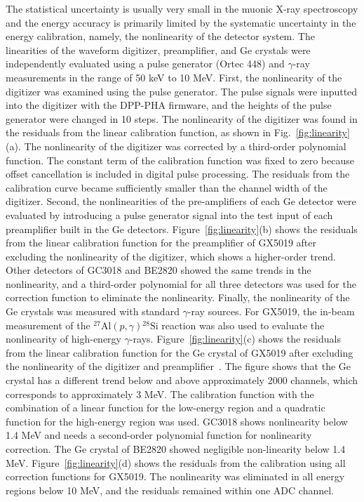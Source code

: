 The statistical uncertainty is usually very small in the muonic X-ray spectroscopy and the energy accuracy is primarily limited by the systematic uncertainty in the energy calibration, namely, the nonlinearity of the detector system.
The linearities of the waveform digitizer, preamplifier, and Ge crystals were independently evaluated using a pulse generator (Ortec 448) and $\gamma$-ray measurements in the range of 50 keV to 10 MeV.
First, the nonlinearity of the digitizer was examined using the pulse generator.
The pulse signals were inputted into the digitizer with the DPP-PHA firmware, and the heights of the pulse generator were changed in 10 steps.
The nonlinearity of the digitizer was found in the residuals from the linear calibration function, as shown in Fig.~\ref{fig:linearity}(a).
The nonlinearity of the digitizer was corrected by a third-order polynomial function.
The constant term of the calibration function was fixed to zero because offset cancellation is included in digital pulse processing.
The residuals from the calibration curve became sufficiently smaller than the channel width of the digitizer.
Second, the nonlinearities of the pre-amplifiers of each Ge detector were evaluated by introducing a pulse generator signal into the test input of each preamplifier built in the Ge detectors. 
Figure~\ref{fig:linearity}(b) shows the residuals from the linear calibration function for the preamplifier of GX5019 after excluding the nonlinearity of the digitizer, which shows a higher-order trend.
Other detectors of GC3018 and BE2820 showed the same trends in the nonlinearity, and a third-order polynomial for all three detectors was used for the correction function to eliminate the nonlinearity.
Finally, the nonlinearity of the Ge crystals was measured with standard $\gamma$-ray sources.
For GX5019, the in-beam measurement of the $^{27}\mathrm{Al}(p,\gamma){}^{28}\mathrm{Si}$ reaction was also used to evaluate the nonlinearity of high-energy $\gamma$-rays.
Figure~\ref{fig:linearity}(c) shows the residuals from the linear calibration function for the Ge crystal of GX5019 after excluding the nonlinearity of the digitizer and preamplifier~\cite{Mizuno2023-px}.
The figure shows that the Ge crystal has a different trend below and above approximately 2000 channels, which corresponds to approximately 3 MeV. 
The calibration function with the combination of a linear function for the low-energy region and a quadratic function for the high-energy region was used.
GC3018 shows nonlinearity below 1.4 MeV and needs a second-order polynomial function for nonlinearity correction.
The Ge crystal of BE2820 showed negligible non-linearity below 1.4 MeV.
Figure~\ref{fig:linearity}(d) shows the residuals from the calibration using all correction functions for GX5019. %
The nonlinearity was eliminated in all energy regions below 10 MeV, and the residuals remained within one ADC channel. %


